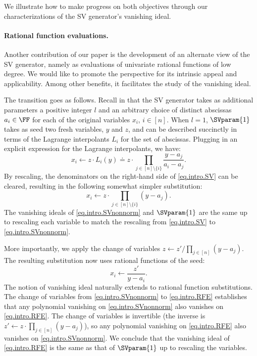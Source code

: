 We illustrate how to make progress on both objectives through our
characterizations of the SV generator's vanishing ideal.

\paragraph{Rational function evaluations.}
Another contribution of our paper is the development of an alternate view of
the SV generator,
namely as evaluations of univariate rational functions of low degree.
We would like to promote the perspective for its intrinsic appeal and 
applicability.
Among other benefits, it facilitates the study of the vanishing ideal.

The transition goes as follows.
Recall in  that the SV generator takes as additional parameters a positive integer $l$
and an arbitrary choice of distinct abscissas $a_i \in \FF$ for each of the original variables $x_i$, \(i\in[n]\).
When \(l=1\), $\SVparam{1}$ takes as seed two fresh variables, $y$ and $z$, and can be described succinctly in terms of the Lagrange interpolants $L_i$ for the set of abscissas. Plugging in an explicit expression for the Lagrange interpolants, we have:
\begin{equation}\label{eq.intro.SV}
  x_i \gets z \cdot L_i(y) \doteq
  z \cdot \prod_{j\in [n]\setminus\{i\}} \frac{y - a_{j}}{a_i - a_{j}}.
\end{equation}
By rescaling,
the denominators on the right-hand side of \eqref{eq.intro.SV} can be cleared,
resulting in the following somewhat simpler substitution:
\begin{equation}\label{eq.intro.SVnonnorm}
  x_i \gets z \cdot
    \prod_{j\in [n]\setminus\{i\}} (y - a_{j}).
\end{equation}
The vanishing ideals of \eqref{eq.intro.SVnonnorm} and $\SVparam{1}$ are the
same up to rescaling each variable to match the rescaling from
\eqref{eq.intro.SV} to \eqref{eq.intro.SVnonnorm}.

More importantly,
we apply the change of variables
$z \gets z' / \prod_{j \in [n]} (y - a_j)$. The
resulting substitution now uses rational functions of the seed:
\begin{equation}\label{eq.intro.RFE}
  x_i \gets \frac{z'}{y-a_i}.
\end{equation}
The notion of vanishing ideal naturally extends to rational function
substitutions.
The change of variables from \eqref{eq.intro.SVnonnorm} to
\eqref{eq.intro.RFE} establishes that any polynomial vanishing on
\eqref{eq.intro.SVnonnorm} also vanishes on \eqref{eq.intro.RFE}.
The change of variables is invertible
(the inverse is $z' \gets z \cdot \prod_{j\in [n]} (y-a_j)$),
so any polynomial vanishing on \eqref{eq.intro.RFE} also vanishes on
\eqref{eq.intro.SVnonnorm}.
We conclude that the vanishing ideal of \eqref{eq.intro.RFE} is the same as
that of $\SVparam{1}$ up to rescaling the variables.

